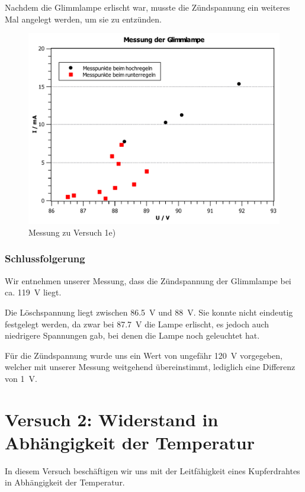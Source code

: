 \documentclass[11pt,a4paper,titlepage, ngerman]{article}
\begin{document}
				Nachdem die Glimmlampe erlischt war, musste die Zündspannung ein weiteres Mal angelegt werden, um sie zu entzünden.
			
				\begin{figure}
					\centering
					\includegraphics[width=\textwidth]{KennlinieGlimmlampe.pdf}
					\caption{Messung zu Versuch 1e)}
					\label{KL e}
				\end{figure}
			
			\subsubsection*{Schlussfolgerung}
			
				Wir entnehmen unserer Messung, dass die Zündspannung der Glimmlampe bei ca. \SI{119}{\V} liegt.
				
				Die Löschspannung liegt zwischen \SI{86,5}{\V} und \SI{88}{\V}. Sie konnte nicht eindeutig festgelegt werden, da zwar bei \SI{87,7}{\V} die Lampe erlischt, es jedoch auch niedrigere Spannungen gab, bei denen die Lampe noch geleuchtet hat.
				
				Für die Zündspannung wurde uns ein Wert von ungefähr \SI{120}{\V} vorgegeben, welcher mit unserer Messung weitgehend übereinstimmt, lediglich eine Differenz von \SI{1}{\V}.
						
	\section{Versuch 2: Widerstand in Abhängigkeit der Temperatur}		
		
		In diesem Versuch beschäftigen wir uns mit der Leitfähigkeit eines Kupferdrahtes in Abhängigkeit der Temperatur.
		
\end{document}
